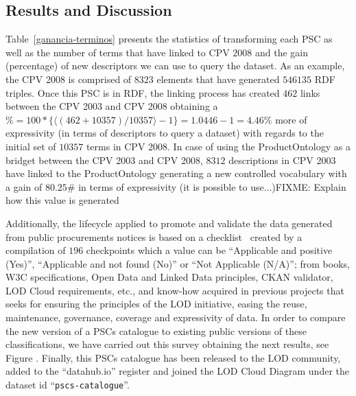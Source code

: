 \subsection{Results and Discussion}
Table~\ref{ganancia-terminos} presents the statistics of transforming each PSC as well as the number of terms that have linked to CPV 2008 and the gain (percentage) of 
new descriptors we can use to query the dataset. As an example, the CPV 2008 is comprised of $8323$ elements that have generated $546135$ RDF triples. 
Once this PSC is in RDF, the linking process has created $462$ links between the CPV 2003 and CPV 2008 obtaining a $\% = 100 * \{ \langle (462+10357) / 10357 \rangle -1 \} = 1.0446-1 = 4.46$\% more 
of expressivity (in terms of descriptors to query a dataset) with regards to the initial set of $10357$ terms in CPV 2008. In case of using the ProductOntology as a bridget 
between the CPV 2003 and CPV 2008, $8312$ descriptions in CPV 2003 have linked to the ProductOntology generating a new controlled vocabulary with a 
gain of $80.25$\# in terms of expressivity (it is possible to use...)FIXME: Explain how this value is generated



Additionally, the lifecycle applied to promote and validate the data generated from public procurements notices is based on 
a checklist~\cite{} created by a compilation of $196$ checkpoints which a value can be ``Applicable and positive (Yes)'', ``Applicable and not found (No)'' or ``Not Applicable (N/A)''; 
from books, W3C specifications, Open Data and Linked Data principles, CKAN validator, LOD Cloud requirements, etc., 
and know-how acquired in previous projects that seeks for ensuring the principles of the LOD initiative, 
easing the reuse, maintenance, governance, coverage and expressivity of data. 
In order to compare the new version of a PSCs catalogue to existing public versions of these classifications, 
we have carried out this survey obtaining the next results, see Figure . Finally, this PSCs catalogue has been released to the LOD community, added to the ``datahub.io'' 
register and joined the LOD Cloud Diagram under the dataset id ``\texttt{pscs-catalogue}''.



